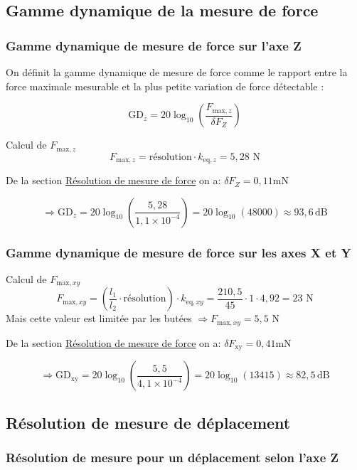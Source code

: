 \documentclass[a4paper, 11pt]{article} %
\begin{document}
\subsection{Gamme dynamique de la mesure de force}
\subsubsection*{Gamme dynamique de mesure de force sur l’axe Z}

On définit la gamme dynamique de mesure de force comme le rapport entre la force maximale mesurable et la plus petite variation de force détectable :

\[
\text{GD}_z = 20 \log_{10} \left( \frac{F_{\text{max}, z}}{\delta F_Z} \right)
\]

Calcul de $F_{\text{max}, z}$
$$
{F_{\text{max}, z}} = {\text{résolution}} \cdot k_{\text{eq},z} = 5,28 \text{ N}
$$


De la section \hyperref[Résolution]{Résolution de mesure de force} on a: ${\delta F_Z} = 0,11 \text{mN}$

$$
\Rightarrow \text{GD}_z = 20 \log_{10} \left( \frac{5,28}{1,1 \times 10^{-4}} \right) = 20 \log_{10}(48000) \approx 93,6 \, \text{dB}
$$
\subsubsection*{Gamme dynamique de mesure de force sur les axes X et Y}
Calcul de $F_{\text{max}, xy}$
$$
{F_{\text{max}, xy}} = \left( \frac{l_1}{l_2} \cdot {\text{résolution}} \right)\cdot k_{\text{eq},xy} = \frac{210,5}{45} \cdot 1  \cdot 4,92 = 23
\text{ N}
$$
Mais cette valeur est limitée par les butées $\Rightarrow {F_{\text{max}, xy}} = 5,5  \text{ N} $

De la section  \hyperref[Résolution]{Résolution de mesure de force} on a:
$
{\delta F_\text{xy}} = 0,41 \text{mN}
$

$$
\Rightarrow \text{GD}_\text{xy} = 20 \log_{10} \left( \frac{5,5}{4,1 \times 10^{-4}} \right) = 20 \log_{10}(13 415) \approx 82,5 \, \text{dB}
$$
\subsection{Résolution de mesure de déplacement}

\subsubsection*{Résolution de mesure pour un déplacement selon l’axe Z}
\end{document}
